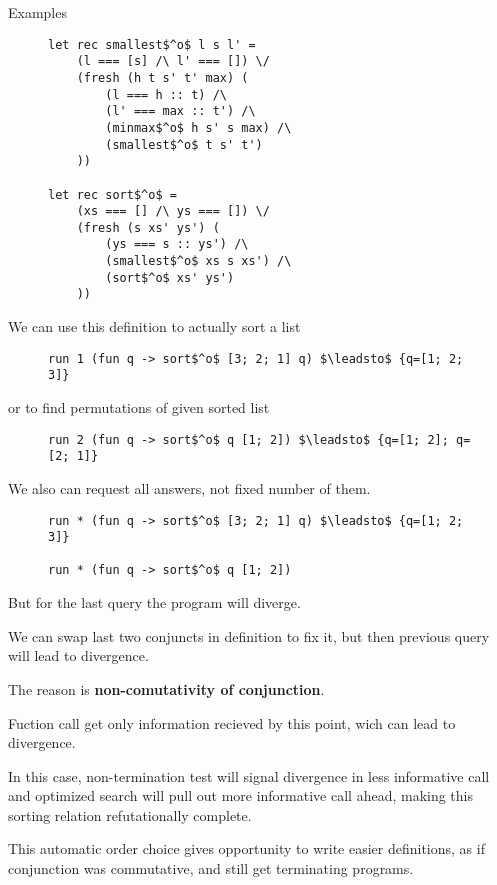 \documentclass[final]{beamer}
\newlength{\onecolwid}
\begin{document}
\begin{frame}[fragile]
\begin{columns}[t]
\begin{column}{\onecolwid}
\begin{block}{Examples}
\begin{figure}
\begin{lstlisting}
let rec smallest$^o$ l s l' =
	(l === [s] /\ l' === []) \/
	(fresh (h t s' t' max) (
		(l === h :: t) /\
		(l' === max :: t') /\
		(minmax$^o$ h s' s max) /\
		(smallest$^o$ t s' t')
	))

let rec sort$^o$ =
	(xs === [] /\ ys === []) \/
	(fresh (s xs' ys') (
		(ys === s :: ys') /\
		(smallest$^o$ xs s xs')	/\
		(sort$^o$ xs' ys')
	))
\end{lstlisting}
\end{figure}

We can use this definition to actually sort a list

\begin{figure}
\begin{lstlisting}
run 1 (fun q -> sort$^o$ [3; 2; 1] q) $\leadsto$ {q=[1; 2; 3]}
\end{lstlisting}
\end{figure}

or to find permutations of given sorted list

\begin{figure}
\begin{lstlisting}
run 2 (fun q -> sort$^o$ q [1; 2]) $\leadsto$ {q=[1; 2]; q=[2; 1]}
\end{lstlisting}
\end{figure}

We also can request all answers, not fixed number of them.

\begin{figure}
\begin{lstlisting}
run * (fun q -> sort$^o$ [3; 2; 1] q) $\leadsto$ {q=[1; 2; 3]}

run * (fun q -> sort$^o$ q [1; 2])
\end{lstlisting}
\end{figure}

But for the last query the program will diverge.

We can swap last two conjuncts in definition to fix it, but then previous query will lead to divergence.

The reason is \textbf{non-comutativity of conjunction}.

Fuction call get only information recieved by this point, wich can lead to divergence.

In this case, non-termination test will signal divergence in less informative call and optimized search will pull out more informative call ahead, making this sorting relation refutationally complete. 

This automatic order choice gives opportunity to write easier definitions, as if conjunction was commutative, and still get terminating programs. 


\end{block}
\end{column}
\end{columns}
\end{frame}
\end{document}
